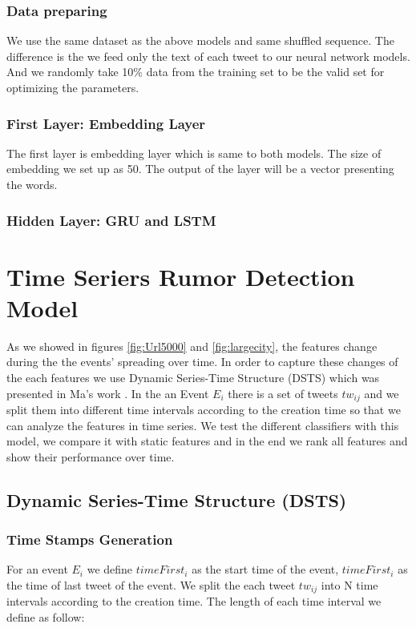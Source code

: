   \subsection{Data preparing} %
We use the same dataset as the above models and same shuffled sequence. The difference is the we feed only the text of each tweet to our neural network models. And we randomly take 10\% data from the training set to be the valid set for optimizing
 the parameters. 
 \subsection{First Layer: Embedding Layer}  
 The first layer is embedding layer which is same to both models. The size of embedding we set up as 50. The output of the layer will be a vector presenting the words. 
  \subsection{Hidden Layer: GRU and LSTM}  
  

\chapter{Time Seriers Rumor Detection Model} %
\label{cha:timr_seriers_rumor_model}
As we showed in figures \ref{fig:Url5000} and \ref{fig:largecity}, the features change during the the events' spreading over time. In order to capture these changes of the each features we use Dynamic Series-Time Structure (DSTS) which was presented in Ma's work \cite{ma2015detect}. In the an Event $E_{i}$ there is a set of tweets $tw_{ij}$ and we split them into different time intervals according to the creation time so that we can analyze the features in time series. We test the different classifiers with this model, we compare it with static features and in the end we rank all features and show their performance over time.
  \section{ Dynamic Series-Time Structure (DSTS)} 
   \subsection{Time Stamps Generation} 
   For an event $E_i$ we define $timeFirst_i$ as the start time of the event, $timeFirst_i$ as the time of last tweet of the event. We split the each tweet $tw_{ij}$ into N time intervals according to the creation time. The length of each time interval we define as follow: 
   
